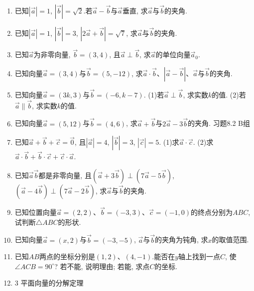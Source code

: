 \documentclass[10pt,a4paper]{article}
\begin{document}
\begin{enumerate}[1.]
\item 已知$|\overrightarrow a|=1$, $|\overrightarrow b|=\sqrt 2$.若$\overrightarrow a-\overrightarrow b$与$\overrightarrow a$垂直, 求$\overrightarrow a$与$\overrightarrow b$的夹角.
\item 已知$|\overrightarrow a|=1$, $|\overrightarrow b|=3$, $|2\overrightarrow a+\overrightarrow b|=\sqrt 7$, 求$\overrightarrow a$与$\overrightarrow b$的夹角.
\item 已知$\overrightarrow a$为非零向量, $\overrightarrow b=(3,4)$, 且$\overrightarrow a\perp \overrightarrow b$, 求$\overrightarrow a$的单位向量$\overrightarrow a_0$.
\item 已知向量$\overrightarrow a=(3,4)$与$\overrightarrow b=(5,-12)$, 求$\overrightarrow a\cdot \overrightarrow b$、$|\overrightarrow a-\overrightarrow b|$、$\overrightarrow a$与$\overrightarrow b$的夹角.
\item 已知向量$\overrightarrow a=(3k,3)$与$\overrightarrow b=(-6,k-7)$.
(1)若$\overrightarrow a\perp \overrightarrow b$, 求实数$k$的值.
(2)若$\overrightarrow a\parallel \overrightarrow b$, 求实数$k$的值.
\item 已知向量$\overrightarrow a=(5,12)$与$\overrightarrow b=(4,6)$, 求$\overrightarrow a+\overrightarrow b$与$2\overrightarrow a-3\overrightarrow b$的夹角.
习题8.2  B组
\item 已知$\overrightarrow a+\overrightarrow b+\overrightarrow c=\overrightarrow 0$, 且$|\overrightarrow a|=4$, $|\overrightarrow b|=3$, $|\overrightarrow c|=5$.
(1)求$\overrightarrow a\cdot \overrightarrow c$.
(2)求$\overrightarrow a\cdot \overrightarrow b+\overrightarrow b\cdot \overrightarrow c+\overrightarrow c\cdot \overrightarrow a$.
\item 已知$\overrightarrow a\overrightarrow b$都是非零向量, 且$(\overrightarrow a+3\overrightarrow b)\perp (7\overrightarrow a-5\overrightarrow b)$, $(\overrightarrow a-4\overrightarrow b)\perp (7\overrightarrow a-2\overrightarrow b)$, 求$\overrightarrow a$与$\overrightarrow b$的夹角.
\item 已知位置向量$\overrightarrow a=(2,2)$、$\overrightarrow b=(-3,3)$、$\overrightarrow c=(-1,0)$的终点分别为$ABC$, 试判断$\triangle ABC$的形状.
\item 已知向量$\overrightarrow a=(x,2)$与$\overrightarrow b=(-3,-5)$, $\overrightarrow a$与$\overrightarrow b$的夹角为钝角, 求$x$的取值范围.
\item 已知$AB$两点的坐标分别是$(1,2)$、$(4,-1)$.能否在$y$轴上找到一点$C$, 使$\angle ACB=90^{\circ }$? 若不能, 说明理由; 若能, 求点$C$的坐标.
\item 3  平面向量的分解定理

\end{enumerate}
\end{document}
